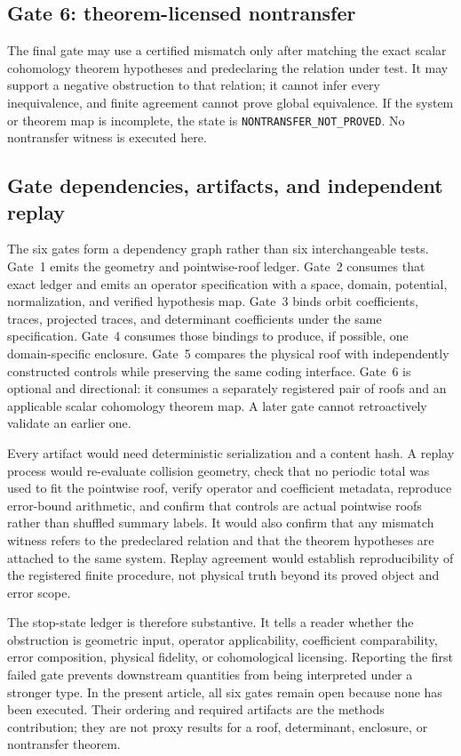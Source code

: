 \documentclass[11pt,a4paper]{article}
\begin{document}
\subsection{Gate 6: theorem-licensed nontransfer}

The final gate may use a certified mismatch only after matching the exact scalar cohomology theorem hypotheses and predeclaring the relation under test. It may support a negative obstruction to that relation; it cannot infer every inequivalence, and finite agreement cannot prove global equivalence. If the system or theorem map is incomplete, the state is \texttt{NONTRANSFER\_NOT\_PROVED}. No nontransfer witness is executed here.

\subsection{Gate dependencies, artifacts, and independent replay}

The six gates form a dependency graph rather than six interchangeable tests. Gate~1 emits the geometry and pointwise-roof ledger. Gate~2 consumes that exact ledger and emits an operator specification with a space, domain, potential, normalization, and verified hypothesis map. Gate~3 binds orbit coefficients, traces, projected traces, and determinant coefficients under the same specification. Gate~4 consumes those bindings to produce, if possible, one domain-specific enclosure. Gate~5 compares the physical roof with independently constructed controls while preserving the same coding interface. Gate~6 is optional and directional: it consumes a separately registered pair of roofs and an applicable scalar cohomology theorem map. A later gate cannot retroactively validate an earlier one.

Every artifact would need deterministic serialization and a content hash. A replay process would re-evaluate collision geometry, check that no periodic total was used to fit the pointwise roof, verify operator and coefficient metadata, reproduce error-bound arithmetic, and confirm that controls are actual pointwise roofs rather than shuffled summary labels. It would also confirm that any mismatch witness refers to the predeclared relation and that the theorem hypotheses are attached to the same system. Replay agreement would establish reproducibility of the registered finite procedure, not physical truth beyond its proved object and error scope.

The stop-state ledger is therefore substantive. It tells a reader whether the obstruction is geometric input, operator applicability, coefficient comparability, error composition, physical fidelity, or cohomological licensing. Reporting the first failed gate prevents downstream quantities from being interpreted under a stronger type. In the present article, all six gates remain open because none has been executed. Their ordering and required artifacts are the methods contribution; they are not proxy results for a roof, determinant, enclosure, or nontransfer theorem.
\end{document}
